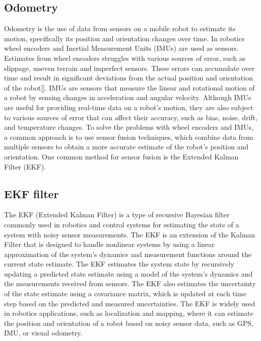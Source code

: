 \subsection{Odometry}
Odometry is the use of data from sensors on a mobile robot to estimate its motion, specifically its position and orientation changes over time. In robotics wheel encoders and Inertial Measurement Units (IMUs) are used as sensors. Estimates from wheel encoders struggles with various sources of error, such as slippage, uneven terrain and imperfect sensors. These errors can accumulate over time and result in significant deviations from the actual position and orientation of the robot[]. 
IMUs are sensors that measure the linear and rotational motion of a robot by sensing changes in acceleration and angular velocity. Although IMUs are useful for providing real-time data on a robot's motion, they are also subject to various sources of error that can affect their accuracy, such as bias, noise, drift, and temperature changes. 
To solve the problems with wheel encoders and IMUs, a common approach is to use sensor fusion techniques, which combine data from multiple sensors to obtain a more accurate estimate of the robot's position and orientation. One common method for sensor fusion is the Extended Kalman Filter (EKF). 

\subsection{EKF filter}
The EKF (Extended Kalman Filter) is a type of recursive Bayesian filter commonly used in robotics and control systems for estimating the state of a system with noisy sensor measurements. The EKF is an extension of the Kalman Filter that is designed to handle nonlinear systems by using a linear approximation of the system's dynamics and measurement functions around the current state estimate. The EKF estimates the system state by recursively updating a predicted state estimate using a model of the system's dynamics and the measurements received from sensors. The EKF also estimates the uncertainty of the state estimate using a covariance matrix, which is updated at each time step based on the predicted and measured uncertainties. The EKF is widely used in robotics applications, such as localization and mapping, where it can estimate the position and orientation of a robot based on noisy sensor data, such as GPS, IMU, or visual odometry.

